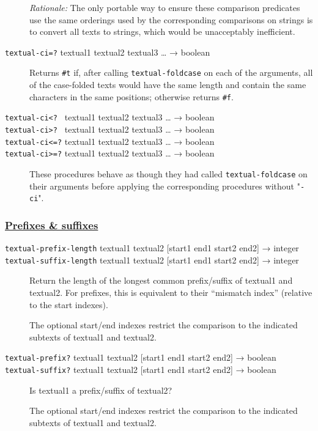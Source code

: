 \begin{description}
\emph{Rationale:} The only portable way to ensure these comparison
predicates use the same orderings used by the corresponding comparisons
on strings is to convert all texts to strings, which would be
unacceptably inefficient.
\item[ \href{}{} \texttt{textual-ci=?} textual1 textual2 textual3
\ldots{} → boolean ]
Returns \texttt{\#t} if, after calling \texttt{textual-foldcase} on each
of the arguments, all of the case-folded texts would have the same
length and contain the same characters in the same positions; otherwise
returns \texttt{\#f}.
\item[ \href{}{} \href{}{} \href{}{} \href{}{}
\texttt{textual-ci\textless{}?~} textual1 textual2 textual3 \ldots{} →
boolean\\
\texttt{textual-ci\textgreater{}?~} textual1 textual2 textual3 \ldots{}
→ boolean\\
\texttt{textual-ci\textless{}=?} textual1 textual2 textual3 \ldots{} →
boolean\\
\texttt{textual-ci\textgreater{}=?} textual1 textual2 textual3 \ldots{}
→ boolean ]
These procedures behave as though they had called
\texttt{textual-foldcase} on their arguments before applying the
corresponding procedures without "\texttt{-ci}".
\end{description}

\subsubsection{\texorpdfstring{\href{}{Prefixes \&
suffixes}}{Prefixes \& suffixes}}\label{prefixes-suffixes}

\begin{description}
\item[ \href{}{} \href{}{} \texttt{textual-prefix-length} textual1
textual2 {[}start1 end1 start2 end2{]} → integer\\
\texttt{textual-suffix-length} textual1 textual2 {[}start1 end1 start2
end2{]} → integer ]
Return the length of the longest common prefix/suffix of textual1 and
textual2. For prefixes, this is equivalent to their ``mismatch index''
(relative to the start indexes).

The optional start/end indexes restrict the comparison to the indicated
subtexts of textual1 and textual2.
\item[ \href{}{} \href{}{} \href{}{} \href{}{} \texttt{textual-prefix?}
textual1 textual2 {[}start1 end1 start2 end2{]} → boolean\\
\texttt{textual-suffix?} textual1 textual2 {[}start1 end1 start2 end2{]}
→ boolean ]
Is textual1 a prefix/suffix of textual2?

The optional start/end indexes restrict the comparison to the indicated
subtexts of textual1 and textual2.
\end{description}

